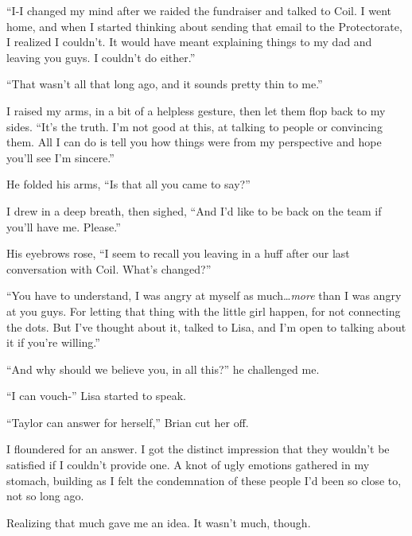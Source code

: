 ``I-I changed my mind after we raided the fundraiser and talked to Coil.  I went home, and when I started thinking about sending that email to the Protectorate, I realized I couldn't.  It would have meant explaining things to my dad and leaving you guys.  I couldn't do either.''



``That wasn't all that long ago, and it sounds pretty thin to me.''



I raised my arms, in a bit of a helpless gesture, then let them flop back to my sides.  ``It's the truth.  I'm not good at this, at talking to people or convincing them.  All I can do is tell you how things were from my perspective and hope you'll see I'm sincere.''



He folded his arms, ``Is that all you came to say?''



I drew in a deep breath, then sighed, ``And I'd like to be back on the team if you'll have me.  Please.''



His eyebrows rose, ``I seem to recall you leaving in a huff after our last conversation with Coil.  What's changed?''



``You have to understand, I was angry at myself as much\ldots \emph{more} than I was angry at you guys.  For letting that thing with the little girl happen, for not connecting the dots.  But I've thought about it, talked to Lisa, and I'm open to talking about it if you're willing.''



``And why should we believe you, in all this?'' he challenged me.



``I can vouch-'' Lisa started to speak.



``Taylor can answer for herself,'' Brian cut her off.



I floundered for an answer.  I got the distinct impression that they wouldn't be satisfied if I couldn't provide one.  A knot of ugly emotions gathered in my stomach, building as I felt the condemnation of these people I'd been so close to, not so long ago.



Realizing that much gave me an idea.  It wasn't much, though.



